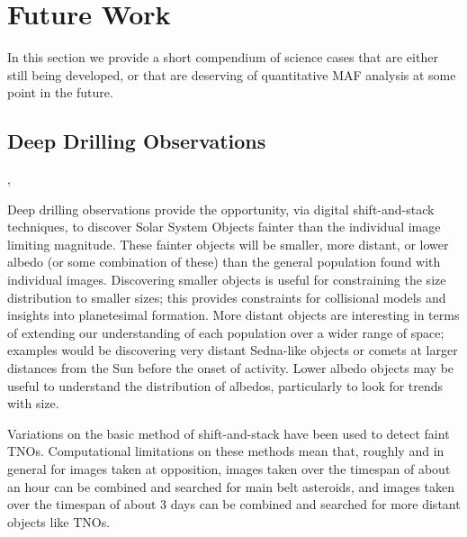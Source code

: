 %
%

\section{Future Work}
\def\secname{\chpname:future}\label{sec:\secname}

In this section we provide a short compendium of science cases that
are either still being developed, or that are deserving of quantitative
MAF analysis at some point in the future.

%
\subsection{Deep Drilling Observations}
\def\secname{\chpname:dd}\label{sec:\secname}

,

Deep drilling observations provide the opportunity, via digital
shift-and-stack techniques, to discover Solar System Objects fainter
than the individual image limiting magnitude. These fainter objects
will be smaller, more distant, or lower albedo (or some combination of these)
than the general population found with individual images. Discovering smaller
objects is useful for constraining the size distribution to smaller
sizes; this provides constraints for collisional models and insights
into planetesimal formation. More distant objects are interesting in
terms of extending our understanding of each population over a wider
range of space; examples would be discovering very distant
Sedna-like objects or comets at larger distances from the Sun before
the onset of activity. Lower albedo objects may be useful to
understand the distribution of albedos, particularly to look for
trends with size.

Variations on the basic method of shift-and-stack have been used to
detect faint TNOs.
Computational limitations on these methods mean that, roughly and in
general for images taken at opposition, images taken over the timespan
of about an hour can be combined and searched for main belt asteroids,
and images taken over the timespan of about 3 days can be combined and
searched for more distant objects like TNOs.

